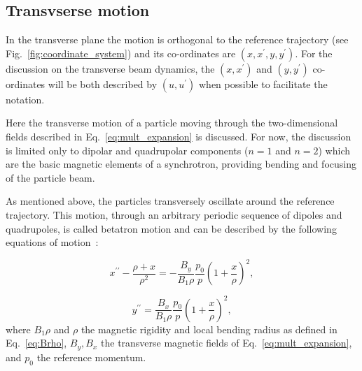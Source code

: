 


\subsection{Transvserse motion}
In the transverse plane the motion is orthogonal to the reference trajectory (see Fig.~\ref{fig:coordinate_system}) and its co-ordinates are $(x, x^\prime, y, y^\prime)$. For the discussion on the transverse beam dynamics, the $(x, x^\prime)$ and $(y, y^\prime)$ co-ordinates will be both described by $(u, u^\prime)$ when possible to facilitate the notation.

Here the transverse motion of a particle moving through the two-dimensional fields described in Eq.~\eqref{eq:mult_expansion} is discussed. For now, the discussion is limited only to dipolar and quadrupolar components ($n=1$ and $n=2$) which are the basic magnetic elements of a synchrotron, providing bending and focusing of the particle beam. 

As mentioned above, the particles transversely oscillate around the reference trajectory. This motion, through an arbitrary periodic sequence of dipoles and quadrupoles, is called betatron motion and can be described by the following equations of motion~\cite{Lee:1425444}: %

 \begin{equation}\label{eq:transverse_eq_x_non_linear}
   x^{\prime \prime} - \frac{\rho+x}{\rho^2} = - \frac{B_y}{B_1 \rho} \frac{p_0}{p} \left (  1+ \frac{x}{\rho} \right )^2, 
 \end{equation}

\begin{equation}\label{eq:transverse_eq_y_non_linear}
    y^{\prime \prime} = \frac{B_x}{B_1 \rho} \frac{p_0}{p}  \left (  1+ \frac{x}{\rho} \right )^2, 
\end{equation}
where $B_1 \rho$ and $\rho$ the magnetic rigidity and local bending radius as defined in Eq.~\eqref{eq:Brho},  $B_y, B_x$ the transverse magnetic fields of Eq.~\eqref{eq:mult_expansion}, and $p_0$ the reference momentum.

